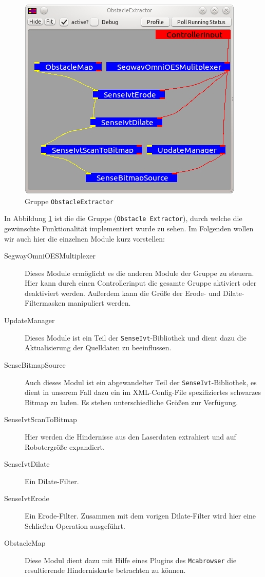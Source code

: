 \begin{figure}[h]
\center
\includegraphics[scale=0.8]{graphics/ObstacleExtractor.jpg}
\caption{\label{fig:obstacleExtractor} Gruppe \lstinline{ObstacleExtractor}}
\end{figure}
 In Abbildung \ref{fig:obstacleExtractor} ist die die Gruppe
 (\lstinline{Obstacle Extractor}), durch welche die gewünschte Funktionalität implementiert wurde zu sehen.
 Im Folgenden wollen wir auch hier die einzelnen Module kurz vorstellen:

\begin{description}
\item[SegwayOmniOESMultiplexer] Dieses Module ermöglicht es die anderen Module der Gruppe zu steuern.
 Hier kann durch einen Controllerinput die gesamte Gruppe aktiviert oder deaktiviert werden.
 Außerdem kann die Größe der Erode- und Dilate-Filtermasken manipuliert werden.
\item[UpdateManager] Dieses Module ist ein Teil der
\lstinline{SenseIvt}-Bibliothek und dient dazu die Aktualisierung der Quelldaten
zu beeinflussen.
\item[SenseBitmapSource] Auch dieses Modul ist ein abgewandelter Teil der
\lstinline{SenseIvt}-Bibliothek, es dient in unserem Fall dazu ein im
XML-Config-File spezifiziertes schwarzes Bitmap zu laden.
 Es stehen unterschiedliche Größen zur Verfügung.
\item[SenseIvtScanToBitmap] Hier werden die Hindernisse aus den Laserdaten extrahiert und auf Robotergröße expandiert.
\item[SenseIvtDilate] Ein Dilate-Filter.
\item[SenseIvtErode] Ein Erode-Filter. Zusammen mit dem vorigen Dilate-Filter wird hier eine Schließen-Operation ausgeführt.
\item[ObstacleMap] Diese Modul dient dazu mit Hilfe eines Plugins des
\lstinline{Mcabrowser} die resultierende Hinderniskarte betrachten zu können.
\end{description}

